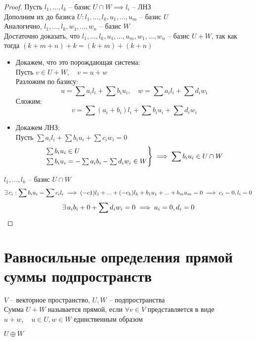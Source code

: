 \begin{proof}
    Пусть $ l_1, ..., l_k $ -- базис $ U \cap W \implies l_i $ -- ЛНЗ \\
    Дополним их до базиса $U : l_1, ..., l_k, u_1, ..., u_m $ -- базис $U$ \\
    Аналогично, $ l_1, ..., l_k, w_1, ..., w_n $ -- базис $W$ \\
    Достаточно доказать, что $ l_1, ..., l_k, u_1, ..., u_m, w_1, ..., w_n $ -- базис $ U + W $, так как тогда $ (k + m + n) + k = (k + m) + (k + n) $
	\begin{itemize}
		\item Докажем, что это порождающая система: \\
	    Пусть $ v \in U + W, \quad v = u + w $ \\
	    Разложим по базису:
	    $$ u = \sum a_il_i + \sum b_iu_i, \quad w = \sum a_il_i + \sum d_iw_i $$
	    Сложим:
	    $$ v = \sum(a_i + b_i)l_i + \sum b_i u_i + \sum d_i w_i $$
		\item Докажем ЛНЗ: \\
	    Пусть $ \sum a_il_i + \sum b_i u_i + \sum c_i w_i = 0 $
	    $$
	    \begin{rcases}
			\sum b_i u_i \in U \\
	        \sum b_i u_i = - \sum a_i b_i - \sum d_i w_i \in W
	    \end{rcases} \implies \sum b_iu_i \in U \cap W $$
	\end{itemize}
    $ l_1, ..., l_k $ -- базис $ U \cap W $
    $$ \exists\, c_i : \sum b_iu_i = \sum c_il_i \implies (-c1)l_1 + ... + (-c_k)l_k + b_1u_1 + ... + b_mu_m = 0 \implies c_i = 0, l_i = 0 $$
    $$ \exists\, a_ib_i + 0 + \sum d_iw_i = 0 \implies a_i = 0, d_i = 0 $$
\end{proof}

\section{Равносильные определения прямой суммы подпространств}

\begin{definition}\label{def:1}
	$ V $ -- векторное пространство, $U, W $ -- подпространства \\
    Сумма $ U + W $ называется прямой, если $ \forall v \in V $ представляется в виде $ u + w, \quad u \in U, w \in W $ единственным образом
\end{definition}

\begin{notation}
	$ U \oplus W $
\end{notation}

